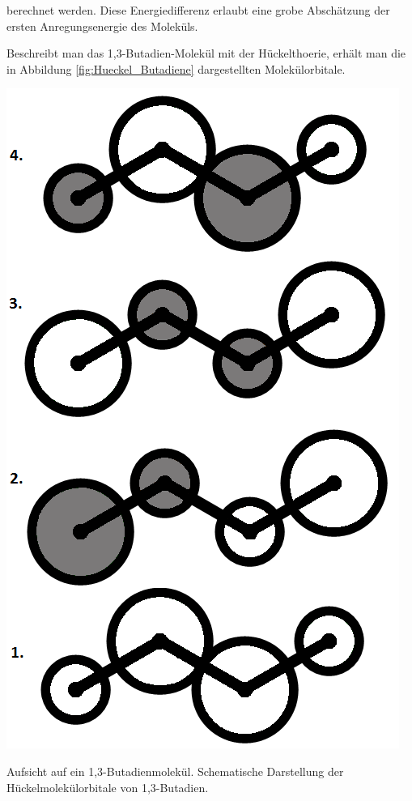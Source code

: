 berechnet werden. Diese Energiedifferenz erlaubt eine grobe Abschätzung der ersten Anregungsenergie des Moleküls.

Beschreibt man das 1,3-Butadien-Molekül mit der Hückelthoerie, erhält man die in Abbildung  \ref{fig:Hueckel_Butadiene} dargestellten Molekülorbitale.

\begin{dsafigure}
 \centering
 \includegraphics[width=\columnwidth]{pics/Hueckel_Butadiene.png}
 \caption{Aufsicht auf ein 1,3-Butadienmolekül. Schematische Darstellung der Hückelmolekülorbitale von 1,3-Butadien.}
 \label{fig:Hueckel_Butadiene}
\end{dsafigure}

